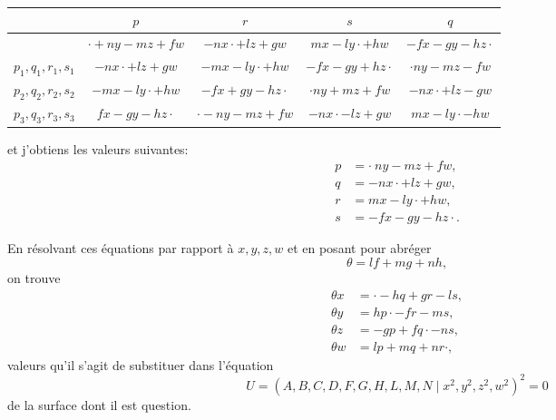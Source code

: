 \documentclass[11pt]{article}
\begin{document}
\medskip
\begin{center}
\renewcommand{\arraystretch}{1.3}
\begin{tabular}{|c|c|c|c|c|}
\hline
 & $p$ & $r$ & $s$ & $q$ \\
\hline
 & $\cdot + ny - mz + fw$ & $-nx \cdot + lz + gw$ & $mx - ly \cdot + hw$ & $-fx - gy - hz \cdot$ \\
\hline
$p_{1}, q_{1}, r_{1}, s_{1}$ & $-nx \cdot + lz + gw$ & $-mx - ly \cdot + hw$ & $-fx - gy + hz \cdot$ & $\cdot ny - mz - fw$ \\
\hline
$p_{2}, q_{2}, r_{2}, s_{2}$ & $-mx - ly \cdot + hw$ & $-fx + gy - hz \cdot$ & $\cdot ny + mz + fw$ & $-nx \cdot + lz - gw$ \\
\hline
$p_{3}, q_{3}, r_{3}, s_{3}$ & $fx - gy - hz \cdot$ & $\cdot - ny - mz + fw$ & $-nx \cdot - lz + gw$ & $mx - ly \cdot - hw$ \\
\hline
\end{tabular}
\end{center}

\medskip

et j'obtiens les valeurs suivantes:
\begin{align*}
p &= \cdot\ ny - mz + fw, \\
q &= -nx \cdot + lz + gw, \\
r &= mx - ly \cdot + hw, \\
s &= -fx - gy - hz \cdot .
\end{align*}

En r\'esolvant ces \'equations par rapport \`a $x, y, z, w$ et en posant pour abr\'eger
\[
\theta = lf + mg + nh,
\]
on trouve
\begin{align*}
\theta x &= \cdot - hq + gr - ls, \\
\theta y &= hp \cdot - fr - ms, \\
\theta z &= -gp + fq \cdot - ns, \\
\theta w &= lp + mq + nr \cdot ,
\end{align*}
valeurs qu'il s'agit de substituer dans l'\'equation
\[
U = (A, B, C, D, F, G, H, L, M, N \mid x^{2}, y^{2}, z^{2}, w^{2})^{2} = 0
\]
de la surface dont il est question.
\end{document}
